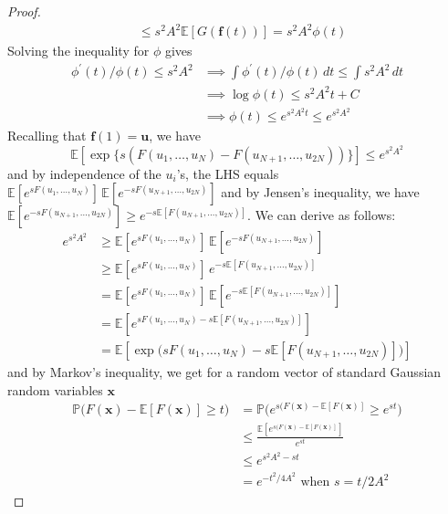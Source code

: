 \begin{proof}
\begin{align*}
      & \leq s^2 A^2 \mathbb{E}[G(\mathbf{f}(t))] = s^2 A^2 \phi(t)
  \end{align*}
  Solving the inequality for $\phi$ gives 
  \begin{align*}
      \phi^\prime (t) / \phi(t) \leq s^2 A^2 & \implies \int \phi^\prime (t) / \phi(t) \,dt \leq \int s^2 A^2 \,dt \\
      & \implies \log{\phi(t)} \leq s^2 A^2 t + C \\
      & \implies \phi(t) \leq e^{s^2 A^2 t} \leq e^{s^2 A^2}
  \end{align*}
  Recalling that $\mathbf{f}(1) = \mathbf{u}$, we have 
  \[\mathbb{E}[\exp\{ s ( F(u_1, \ldots, u_N) - F(u_{N+1}, \ldots, u_{2N})) \}] \leq e^{s^2 A^2}\]
  and by independence of the $u_i$'s, the LHS equals $\mathbb{E}[e^{s F(u_1, \ldots, u_N)}]\, \mathbb{E}[e^{-s F(u_{N+1}, \ldots, u_{2N})}]$ and by Jensen's inequality, we have $\mathbb{E}[e^{-s F(u_{N+1}, \ldots, u_{2N})}] \geq e^{-s \mathbb{E}[F(u_{N+1}, \ldots, u_{2N})]}$. We can derive as follows: 
  \begin{align*}
      e^{s^2 A^2} & \geq \mathbb{E}[e^{s F(u_1, \ldots, u_N)}]\, \mathbb{E}[e^{-s F(u_{N+1}, \ldots, u_{2N})}] \\
      & \geq \mathbb{E}[e^{s F(u_1, \ldots, u_N)}]\, e^{-s \mathbb{E}[F(u_{N+1}, \ldots, u_{2N})]} \\
      & = \mathbb{E}[e^{s F(u_1, \ldots, u_N)}]\, \mathbb{E}[e^{-s \mathbb{E}[F(u_{N+1}, \ldots, u_{2N})]}] \\
      & = \mathbb{E}[e^{s F(u_1, \ldots, u_N) -s \mathbb{E}[F(u_{N+1}, \ldots, u_{2N})]}] \\
      & = \mathbb{E}[\exp \big( s F(u_1, \ldots, u_N) -s \mathbb{E}[F(u_{N+1}, \ldots, u_{2N})] \big) ]
  \end{align*}
  and by Markov's inequality, we get for a random vector of standard Gaussian random variables $\mathbf{x}$
  \begin{align*}
      \mathbb{P} \big( F(\mathbf{x}) - \mathbb{E}[F(\mathbf{x})] \geq t) & = \mathbb{P} \big( e^{s( F(\mathbf{x}) - \mathbb{E}[F(\mathbf{x})]} \geq e^{st} \big) \\
      & \leq \frac{\mathbb{E}[e^{s( F(\mathbf{x}) - \mathbb{E}[F(\mathbf{x})]}]}{e^{st}} \\
      & \leq e^{s^2 A^2 - st} \\
      & = e^{- t^2 / 4A^2} \text{ when } s = t / 2A^2
  \end{align*}
  \end{proof}

